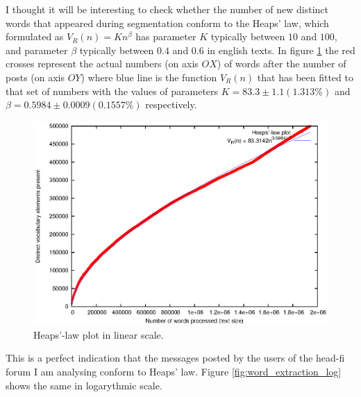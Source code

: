       I thought it will be interesting to check whether the number of new distinct words that appeared during segmentation conform to the Heaps' law, which formulated as $V_R(n) = Kn^\beta$ has parameter $K$ typically between $10$ and $100$, and parameter $\beta$ typically between $0.4$ and $0.6$ in english texts. In figure \ref{fig:word_extraction} the red crosses represent the actual numbers (on axis $OX$) of words after the number of posts (on axis $OY$) where blue line is the function $V_R(n)$ that has been fitted to that set of numbers with the values of parameters $K = 83.3 \pm1.1 (1.313\%)$ and $\beta = 0.5984 \pm0.0009 (0.1557\%)$ respectively. 
      
      \begin{figure}[H]
        \centering
        \includegraphics[width=\textwidth]{chapters/03_implementation/extraction}
        \caption{Heaps'-law plot in linear scale.}
        \label{fig:word_extraction}
      \end{figure}
      
      This is a perfect indication that the messages posted by the users of the head-fi forum I am analysing conform to Heaps' law. Figure \ref{fig:word_extraction_log} shows the same in logarythmic scale.
      
